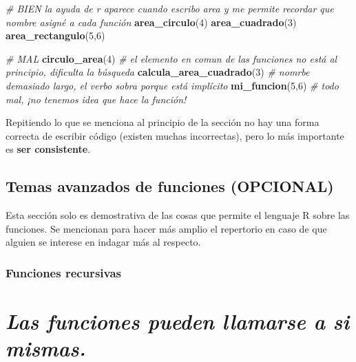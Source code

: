 \documentclass[]{book}
\newenvironment{Shaded}{\begin{snugshade}}{\end{snugshade}}
\newcommand{\KeywordTok}[1]{\textcolor[rgb]{0.13,0.29,0.53}{\textbf{#1}}}
\newcommand{\DecValTok}[1]{\textcolor[rgb]{0.00,0.00,0.81}{#1}}
\newcommand{\CommentTok}[1]{\textcolor[rgb]{0.56,0.35,0.01}{\textit{#1}}}
\newcommand{\NormalTok}[1]{#1}
\theoremstyle{definition}
\theoremstyle{definition}
\theoremstyle{definition}
\theoremstyle{remark}
\begin{document}
\begin{Shaded}
\begin{Highlighting}[]
\CommentTok{# BIEN la ayuda de r aparece cuando escribo area y me permite recordar que nombre asigné a cada función}
\KeywordTok{area_circulo}\NormalTok{(}\DecValTok{4}\NormalTok{)}
\KeywordTok{area_cuadrado}\NormalTok{(}\DecValTok{3}\NormalTok{)}
\KeywordTok{area_rectangulo}\NormalTok{(}\DecValTok{5}\NormalTok{,}\DecValTok{6}\NormalTok{)}

\CommentTok{# MAL}
\KeywordTok{circulo_area}\NormalTok{(}\DecValTok{4}\NormalTok{) }\CommentTok{# el elemento en comun de las funciones no está al principio, dificulta la búsqueda}
\KeywordTok{calcula_area_cuadrado}\NormalTok{(}\DecValTok{3}\NormalTok{) }\CommentTok{# nomrbe demasiado largo, el verbo sobra porque está implícito}
\KeywordTok{mi_funcion}\NormalTok{(}\DecValTok{5}\NormalTok{,}\DecValTok{6}\NormalTok{) }\CommentTok{# todo mal, ¡no tenemos idea que hace la función!}
\end{Highlighting}
\end{Shaded}

Repitiendo lo que se menciona al principio de la sección no hay una
forma correcta de escribir código (existen muchas incorrectas), pero lo
más importante es \textbf{ser consistente}.

\subsection{Temas avanzados de funciones
(OPCIONAL)}\label{temas-avanzados-de-funciones-opcional}

Esta sección solo es demostrativa de las cosas que permite el lenguaje R
sobre las funciones. Se mencionan para hacer más amplio el repertorio en
caso de que alguien se interese en indagar más al respecto.

\subsubsection{Funciones recursivas}\label{funciones-recursivas}

\section{\texorpdfstring{\emph{Las funciones pueden llamarse a si
mismas.}}{Las funciones pueden llamarse a si mismas.}}\label{las-funciones-pueden-llamarse-a-si-mismas.}
\end{document}
